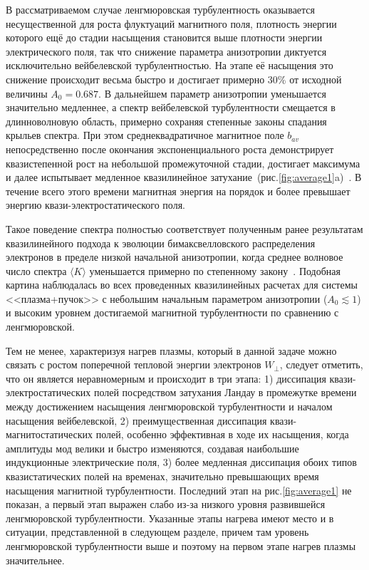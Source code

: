В рассматриваемом случае ленгмюровская турбулентность оказывается несущественной для роста флуктуаций магнитного поля, плотность энергии которого ещё до стадии насыщения становится выше плотности энергии электрического поля, так что снижение параметра анизотропии диктуется исключительно вейбелевской турбулентностью. На этапе её насыщения это снижение происходит весьма быстро и достигает примерно 30\% от исходной величины $A_0=0.687$. В дальнейшем параметр анизотропии уменьшается значительно медленнее, а спектр вейбелевской турбулентности смещается в длинноволновую область, примерно сохраняя степенные законы спадания крыльев спектра. При этом среднеквадратичное магнитное поле $b_{av}$ непосредственно после окончания экспоненциального роста демонстрирует квазистепенной рост на небольшой промежуточной стадии, достигает максимума и далее испытывает медленное квазилинейное затухание~(рис.\ref{fig:average1}a)~\cite{StockemNovo2015,Ruyer2015,Kuznetsov2023}. В течение всего этого времени магнитная энергия на порядок и более превышает энергию квази-электростатического поля.

Такое поведение спектра полностью соответствует полученным ранее результатам квазилинейного подхода к эволюции бимаксвелловского распределения электронов в пределе низкой начальной анизотропии, когда среднее волновое число спектра $\langle K\rangle$ уменьшается примерно по степенному закону~\cite{Borodachev2016_Radiofiz,Kuznetsov2023,Kocharovsky2024}. Подобная картина наблюдалась во всех проведенных квазилинейных расчетах для системы <<плазма+пучок>> с небольшим начальным параметром анизотропии ($A_0\lesssim1$) и высоким уровнем достигаемой магнитной турбулентности по сравнению с ленгмюровской. 

Тем не менее, характеризуя нагрев плазмы, который в данной задаче можно связать с ростом поперечной тепловой энергии электронов $W_\perp$, следует отметить, что он является неравномерным и происходит в три этапа: 1) диссипация квази-электростатических полей посредством затухания Ландау в промежутке времени между достижением насыщения ленгмюровской турбулентности и началом насыщения вейбелевской, 2) преимущественная диссипация квази-магнитостатических полей, особенно эффективная в ходе их насыщения, когда амплитуды мод велики и быстро изменяются, создавая наибольшие индукционные электрические поля, 3) более медленная диссипация обоих типов квазистатических полей на временах, значительно превышающих время насыщения магнитной турбулентности. Последний этап на рис.\ref{fig:average1} не показан, а первый этап выражен слабо из-за низкого уровня развившейся ленгмюровской турбулентности. Указанные этапы нагрева имеют место и в ситуации, представленной в следующем разделе, причем там уровень ленгмюровской турбулентности выше и поэтому на первом этапе нагрев плазмы значительнее.


